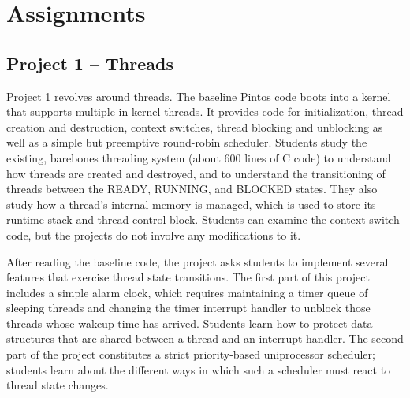 \section{Assignments}
\label{sec:assignments}

\pintostestcounttable{}

%
%

\subsection{Project 1 -- Threads}
Project 1 revolves around threads.  The baseline Pintos code boots into a kernel that
supports multiple in-kernel threads.  It provides code for initialization, thread creation and
destruction, context switches, thread blocking and unblocking as well as a simple but
preemptive round-robin scheduler.
Students study the existing, barebones threading system (about 600 lines of C code) to 
understand how threads are created and destroyed, and to understand the transitioning of 
threads between the READY, RUNNING, and BLOCKED states.  They also study how a thread's
internal memory is managed, which is used to store its runtime stack and thread control block.
Students can examine the context switch code, but the projects do not involve any modifications
to it.

After reading the baseline code, the project asks students to implement several features
that exercise thread state transitions.  The first part of this project includes a simple
alarm clock, which requires maintaining a timer queue of sleeping threads and changing 
the timer interrupt handler to unblock those threads whose wakeup time has arrived.
Students learn how to protect data structures that are shared between a thread and an
interrupt handler.  The second part of the project constitutes a strict priority-based
uniprocessor scheduler; students learn about the different ways in which 
such a scheduler must react to thread state changes.

